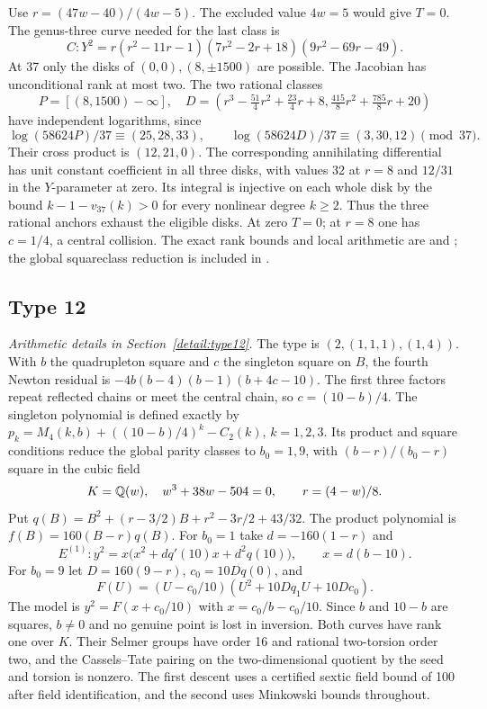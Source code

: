 Use $r=(47w-40)/(4w-5)$. The excluded value $4w=5$ would give $T=0$.
The genus-three curve needed for the last class is
\[
 C:Y^2=r(r^2-11r-1)(7r^2-2r+18)(9r^2-69r-49).
\]
At 37 only the disks of $(0,0),(8,\pm1500)$ are possible.
The Jacobian has unconditional rank at most two. The two rational
classes
\[
 P=[(8,1500)-\infty],\quad
 D=\left(r^3-\tfrac{51}{4}r^2+\tfrac{23}{4}r+8,
          \tfrac{415}{8}r^2+\tfrac{785}{8}r+20\right)
\]
have independent logarithms, since
\[
 \log(58624P)/37\equiv(25,28,33),\qquad
 \log(58624D)/37\equiv(3,30,12)\pmod{37}.
\]
Their cross product is $(12,21,0)$. The corresponding annihilating
differential has unit constant coefficient in all three disks, with
values 32 at $r=8$ and $12/31$ in the $Y$-parameter at zero.
Its integral is injective on each whole disk by the bound
$k-1-v_{37}(k)>0$ for every nonlinear degree $k\geq2$.
Thus the three rational anchors exhaust the eligible disks.
At zero $T=0$; at $r=8$ one has $c=1/4$, a central collision.
The exact rank bounds and local arithmetic are
 and
; the global squareclass reduction
is included in .

\subsection{Type 12}\label{app:type12}
\noindent\emph{Arithmetic details in Section~\ref{detail:type12}.}\enspace
The type is $(2,(1,1,1),(1,4))$. With $b$ the quadrupleton square
and $c$ the singleton square on $B$, the fourth Newton residual is
$-4b(b-4)(b-1)(b+4c-10)$. The first three factors repeat reflected
chains or meet the central chain, so $c=(10-b)/4$. The singleton
polynomial is defined exactly by
$p_k=M_4(k,b)+((10-b)/4)^k-C_2(k)$, $k=1,2,3$.
Its product and square conditions reduce the global parity classes to
$b_0=1,9$, with $(b-r)/(b_0-r)$ square in the cubic field
\[
 K=\mathbb Q(w),\quad w^3+38w-504=0,\qquad r=(4-w)/8.
\]
Put $q(B)=B^2+(r-3/2)B+r^2-3r/2+43/32$.
The product polynomial is $f(B)=160(B-r)q(B)$.
For $b_0=1$ take $d=-160(1-r)$ and
\[
 E^{(1)}:y^2=x\bigl(x^2+dq'(10)x+d^2q(10)\bigr),\qquad x=d(b-10).
\]
For $b_0=9$ let $D=160(9-r)$, $c_0=10Dq(0)$, and
\[
 F(U)=(U-c_0/10)(U^2+10Dq_1U+10Dc_0).
\]
The model is $y^2=F(x+c_0/10)$ with $x=c_0/b-c_0/10$.
Since $b$ and $10-b$ are squares, $b\ne0$ and no genuine point is
lost in inversion. Both curves have rank one over $K$. Their Selmer
groups have order 16 and rational two-torsion order two, and the
Cassels--Tate pairing on the two-dimensional quotient by the seed
and torsion is nonzero. The first descent uses a certified sextic
field bound of 100 after field identification, and the second uses
Minkowski bounds throughout.

